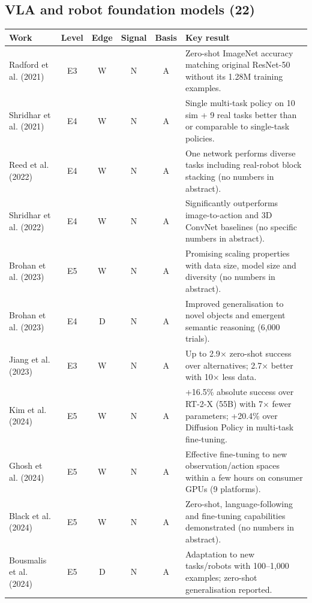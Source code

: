 \documentclass[10pt,a4paper]{article}
\begin{document}
\subsection*{VLA and robot foundation models (22)}
\begin{longtable}{@{}>{\raggedright\arraybackslash}p{4.0cm}cccc>{\raggedright\arraybackslash}p{7.6cm}@{}}
\toprule \textbf{Work} & \textbf{Level} & \textbf{Edge} & \textbf{Signal} & \textbf{Basis} & \textbf{Key result} \\ \midrule \endhead
Radford et al. (2021)~\cite{Radford2021} & E3 & W & N & A & Zero-shot ImageNet accuracy matching original ResNet-50 without its 1.28M training examples. \\
Shridhar et al. (2021)~\cite{Shridhar2021} & E4 & W & N & A & Single multi-task policy on 10 sim + 9 real tasks better than or comparable to single-task policies. \\
Reed et al. (2022)~\cite{Reed2022} & E4 & W & N & A & One network performs diverse tasks including real-robot block stacking (no numbers in abstract). \\
Shridhar et al. (2022)~\cite{Shridhar2022} & E4 & W & N & A & Significantly outperforms image-to-action and 3D ConvNet baselines (no specific numbers in abstract). \\
Brohan et al. (2023)~\cite{Brohan2023a} & E5 & W & N & A & Promising scaling properties with data size, model size and diversity (no numbers in abstract). \\
Brohan et al. (2023)~\cite{Brohan2023b} & E4 & D & N & A & Improved generalisation to novel objects and emergent semantic reasoning (6,000 trials). \\
Jiang et al. (2023)~\cite{Jiang2023} & E3 & W & N & A & Up to 2.9$\times$ zero-shot success over alternatives; 2.7$\times$ better with 10$\times$ less data. \\
Kim et al. (2024)~\cite{Kim2024} & E5 & W & N & A & +16.5\% absolute success over RT-2-X (55B) with 7$\times$ fewer parameters; +20.4\% over Diffusion Policy in multi-task fine-tuning. \\
Ghosh et al. (2024)~\cite{Octo2024} & E5 & W & N & A & Effective fine-tuning to new observation/action spaces within a few hours on consumer GPUs (9 platforms). \\
Black et al. (2024)~\cite{Black2024} & E5 & W & N & A & Zero-shot, language-following and fine-tuning capabilities demonstrated (no numbers in abstract). \\
Bousmalis et al. (2024)~\cite{Bousmalis2023} & E5 & D & N & A & Adaptation to new tasks/robots with 100--1,000 examples; zero-shot generalisation reported. \\

\end{longtable}
\end{document}
